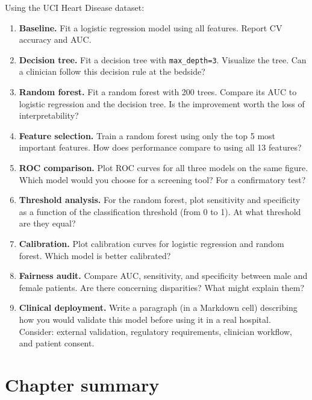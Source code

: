 \begin{exercise}
Using the UCI Heart Disease dataset:
\begin{enumerate}
  \item \textbf{Baseline.} Fit a logistic regression model using all features. Report CV accuracy and AUC.
  \item \textbf{Decision tree.} Fit a decision tree with \texttt{max\_depth=3}. Visualize the tree. Can a clinician follow this decision rule at the bedside?
  \item \textbf{Random forest.} Fit a random forest with 200 trees. Compare its AUC to logistic regression and the decision tree. Is the improvement worth the loss of interpretability?
  \item \textbf{Feature selection.} Train a random forest using only the top 5 most important features. How does performance compare to using all 13 features?
  \item \textbf{ROC comparison.} Plot ROC curves for all three models on the same figure. Which model would you choose for a screening tool? For a confirmatory test?
  \item \textbf{Threshold analysis.} For the random forest, plot sensitivity and specificity as a function of the classification threshold (from 0 to 1). At what threshold are they equal?
  \item \textbf{Calibration.} Plot calibration curves for logistic regression and random forest. Which model is better calibrated?
  \item \textbf{Fairness audit.} Compare AUC, sensitivity, and specificity between male and female patients. Are there concerning disparities? What might explain them?
  \item \textbf{Clinical deployment.} Write a paragraph (in a Markdown cell) describing how you would validate this model before using it in a real hospital. Consider: external validation, regulatory requirements, clinician workflow, and patient consent.
\end{enumerate}
\end{exercise}

\section{Chapter summary}

